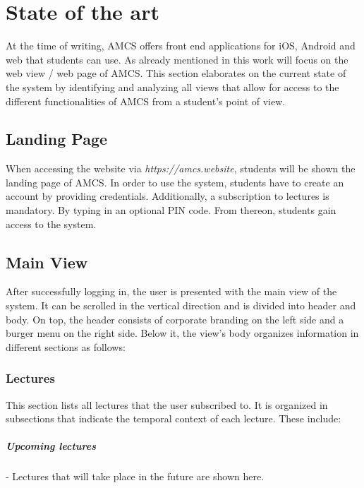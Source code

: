 \chapter{State of the art}
\label{chapter:stateoftheart}
At the time of writing, AMCS offers front end applications for iOS, Android and web that students can use. As already mentioned in \todosct this work will focus on the web view / web page of AMCS.
This section elaborates on the current state of the system by identifying and analyzing all views that allow for access to the different functionalities of AMCS from a student's point of view. 


\section{Landing Page}
\label{section:landingpage}
When accessing the website via \emph{https://amcs.website}, students will be shown the landing page of AMCS.
In order to use the system, students have to create an account by providing credentials. Additionally, a subscription to lectures is mandatory. By typing in an optional PIN code. From thereon, students gain access to the system. 
\todogrf
 
\section{Main View}
\label{section:soa:mainview}
After successfully logging in, the user is presented with the main view of the system.
It can be scrolled in the vertical direction and is divided into header and body. On top, the header consists of corporate branding on the left side and a burger menu on the right side. Below it, the view's body organizes information in different sections as follows:

\todogrf

\subsection{Lectures}
\label{section:soa:mainview:lectures}
This section lists all lectures that the user subscribed to. It is organized in subsections that indicate the temporal context of each lecture. These include:

\paragraph{Upcoming lectures} - Lectures that will take place in the future are shown here.
